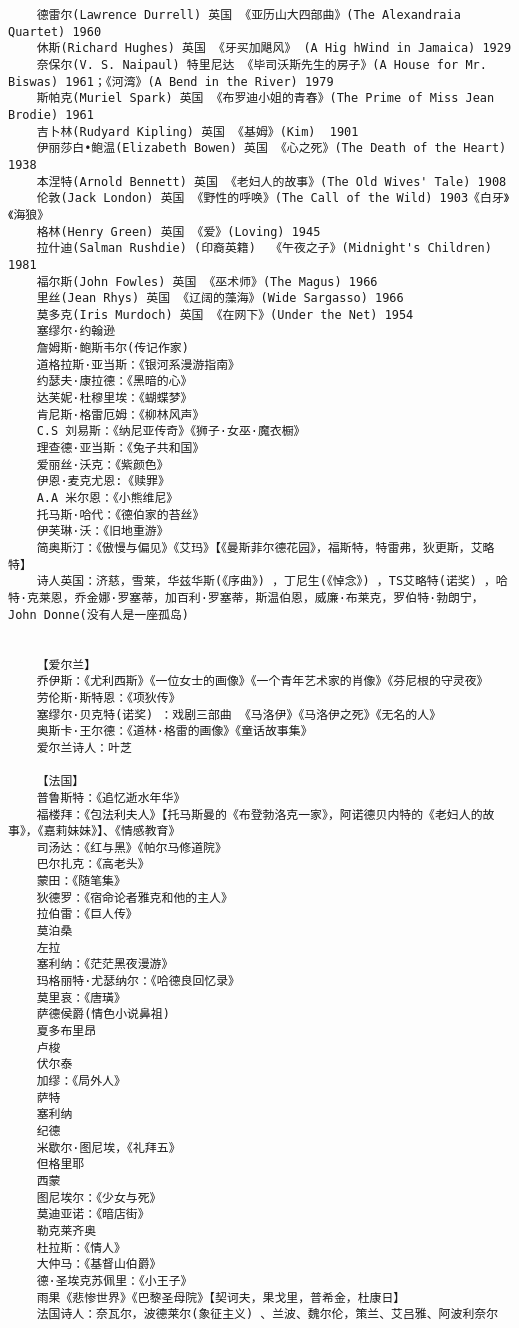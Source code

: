 \documentclass[UTF8]{../../RepresentationUniverse}
\begin{document}
\begin{lstlisting}
    德雷尔(Lawrence Durrell) 英国 《亚历山大四部曲》(The Alexandraia Quartet) 1960
    休斯(Richard Hughes) 英国 《牙买加飓风》 (A Hig hWind in Jamaica) 1929
    奈保尔(V. S. Naipaul) 特里尼达 《毕司沃斯先生的房子》(A House for Mr. Biswas) 1961；《河湾》(A Bend in the River) 1979
    斯帕克(Muriel Spark) 英国 《布罗迪小姐的青春》(The Prime of Miss Jean Brodie) 1961
    吉卜林(Rudyard Kipling) 英国 《基姆》(Kim)  1901
    伊丽莎白•鲍温(Elizabeth Bowen) 英国 《心之死》(The Death of the Heart) 1938
    本涅特(Arnold Bennett) 英国 《老妇人的故事》(The Old Wives' Tale) 1908
    伦敦(Jack London) 英国 《野性的呼唤》(The Call of the Wild) 1903《白牙》《海狼》
    格林(Henry Green) 英国 《爱》(Loving) 1945
    拉什迪(Salman Rushdie) (印裔英籍)  《午夜之子》(Midnight's Children) 1981
    福尔斯(John Fowles) 英国 《巫术师》(The Magus) 1966
    里丝(Jean Rhys) 英国 《辽阔的藻海》(Wide Sargasso) 1966
    莫多克(Iris Murdoch) 英国 《在网下》(Under the Net) 1954
    塞缪尔·约翰逊
    詹姆斯·鲍斯韦尔(传记作家) 
    道格拉斯·亚当斯：《银河系漫游指南》
    约瑟夫·康拉德：《黑暗的心》
    达芙妮·杜穆里埃：《蝴蝶梦》
    肯尼斯·格雷厄姆：《柳林风声》
    C.S 刘易斯：《纳尼亚传奇》《狮子·女巫·魔衣橱》
    理查德·亚当斯：《兔子共和国》
    爱丽丝·沃克：《紫颜色》
    伊恩·麦克尤恩:《赎罪》
    A.A 米尔恩：《小熊维尼》
    托马斯·哈代：《德伯家的苔丝》
    伊芙琳·沃：《旧地重游》
    简奥斯汀：《傲慢与偏见》《艾玛》【《曼斯菲尔德花园》，福斯特，特雷弗，狄更斯，艾略特】
    诗人英国：济慈，雪莱，华兹华斯(《序曲》) ，丁尼生(《悼念》) ，TS艾略特(诺奖) ，哈特·克莱恩，乔金娜·罗塞蒂，加百利·罗塞蒂，斯温伯恩，威廉·布莱克，罗伯特·勃朗宁，John Donne(没有人是一座孤岛) 
    
    
    【爱尔兰】
    乔伊斯：《尤利西斯》《一位女士的画像》《一个青年艺术家的肖像》《芬尼根的守灵夜》
    劳伦斯·斯特恩：《项狄传》
    塞缪尔·贝克特(诺奖) ：戏剧三部曲 《马洛伊》《马洛伊之死》《无名的人》
    奥斯卡·王尔德：《道林·格雷的画像》《童话故事集》
    爱尔兰诗人：叶芝

    【法国】
    普鲁斯特：《追忆逝水年华》
    福楼拜：《包法利夫人》【托马斯曼的《布登勃洛克一家》，阿诺德贝内特的《老妇人的故事》，《嘉莉妹妹》】、《情感教育》
    司汤达：《红与黑》《帕尔马修道院》
    巴尔扎克：《高老头》
    蒙田：《随笔集》
    狄德罗：《宿命论者雅克和他的主人》
    拉伯雷：《巨人传》
    莫泊桑
    左拉
    塞利纳：《茫茫黑夜漫游》
    玛格丽特·尤瑟纳尔：《哈德良回忆录》
    莫里哀：《唐璜》
    萨德侯爵(情色小说鼻祖) 
    夏多布里昂
    卢梭
    伏尔泰
    加缪：《局外人》
    萨特
    塞利纳
    纪德
    米歇尔·图尼埃，《礼拜五》
    但格里耶
    西蒙
    图尼埃尔：《少女与死》
    莫迪亚诺：《暗店街》
    勒克莱齐奥
    杜拉斯：《情人》
    大仲马：《基督山伯爵》
    德·圣埃克苏佩里：《小王子》
    雨果《悲惨世界》《巴黎圣母院》【契诃夫，果戈里，普希金，杜康日】
    法国诗人：奈瓦尔，波德莱尔(象征主义) 、兰波、魏尔伦，策兰、艾吕雅、阿波利奈尔
\end{lstlisting}
\end{document}
